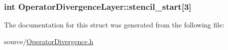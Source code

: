 \subsubsection[{stencil\+\_\+start}]{\setlength{\rightskip}{0pt plus 5cm}int Operator\+Divergence\+Layer\+::stencil\+\_\+start\mbox{[}3\mbox{]}}\label{struct_operator_divergence_layer_adece33a63a9dea1acea07d718d60a9cc}


The documentation for this struct was generated from the following file\+:\begin{DoxyCompactItemize}
\item 
source/\hyperlink{_operator_divergence_8h}{Operator\+Divergence.\+h}\end{DoxyCompactItemize}
